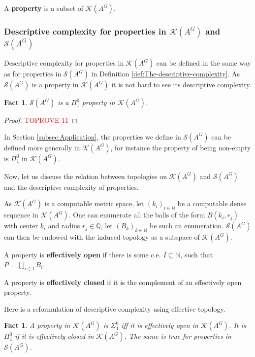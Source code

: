 \documentclass[french,american]{article}
\theoremstyle{plain}
\theoremstyle{definition}
\theoremstyle{remark}
\theoremstyle{plain}
\newtheorem{fact}[theorem]{Fact}
\begin{document}
A \textbf{property }is a subset of $\mathcal{K}(A^{G})$.

\subsubsection{Descriptive complexity for properties in $\mathcal{K}(A^{G})$ and
$\mathcal{S}(A^{G})$}\label{subsec:Descriptive-complexity-for}

Descriptive complexity for properties in $\mathcal{K}(A^{G})$ can
be defined in the same way as for properties in $\mathcal{S}(A^{G})$
in Definition \ref{def:The-descriptive-complexity}. As $\mathcal{S}(A^{G})$
is a property in $\mathcal{K}(A^{G})$ it is not hard to see its descriptive
complexity.
\begin{fact}
\label{fact:Sp01}$\mathcal{S}(A^{G})$ is a $\Pi_{1}^{0}$
property in $\mathcal{K}(A^{G})$. 
\end{fact}

\begin{proof}\textcolor{red}{TOPROVE 11}\end{proof}
In Section \ref{subsec:Application}, the properties we define in
$\mathcal{S}(A^{G})$ can be defined more generally in $\mathcal{K}(A^{G})$,
for instance the property of being non-empty is $\Pi_{1}^{0}$ in
$\mathcal{K}(A^{G})$.

Now, let us discuss the relation between topologies on $\mathcal{K}(A^{G})$
and $\mathcal{S}(A^{G})$ and the descriptive complexity of properties.

As $\mathcal{K}(A^{G})$ is a computable metric space, let $(k_{i})_{i\in\mathbb{N}}$
be a computable dense sequence in $\mathcal{K}(A^{G})$. One can enumerate
all the balls of the form $B(k_{i},r_{j})$ with center $k_{i}$ and
radius $r_{j}\in\mathbb{Q}$, let $(B_{k})_{k\in\mathbb{\mathbb{N}}}$
be such an enumeration. $\mathcal{S}(A^{G})$ can then be endowed with
the induced topology as a subspace of $\mathcal{K}(A^{G})$.

A property is \textbf{effectively open} if there is some c.e. $I\subseteq\mathbb{N}$,
such that $P=\bigcup_{i\in I}B_{i}$.

A property is \textbf{effectively closed} if it is the complement
of an effectively open property.

Here is a reformulation of descriptive complexity using effective
topology.
\begin{fact}
\label{fact:effclo<>p01}A property in
$\mathcal{K}(A^{G})$ is $\Sigma_{1}^{0}$ iff it is effectively open
in $\mathcal{K}(A^{G})$. It is $\Pi_{1}^{0}$ if it is effectively
closed in $\mathcal{K}(A^{G})$. The same is true for properties in $\mathcal{S}(A^{G})$.
\end{fact}
\end{document}
